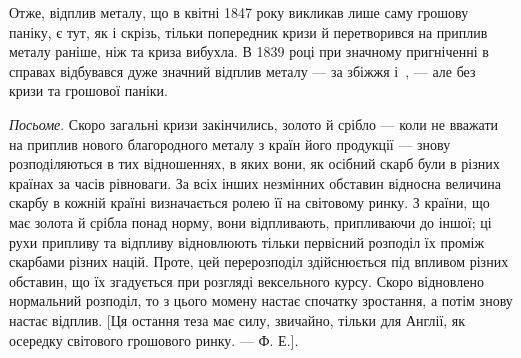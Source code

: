 Отже, відплив металу, що в квітні 1847 року викликав лише саму грошову
паніку, є тут, як і скрізь, тільки попередник кризи й перетворився на
приплив металу раніше, ніж та криза вибухла. В 1839 році при значному пригніченні
в справах відбувався дуже значний відплив металу — за збіжжя і~, —
але без кризи та грошової паніки.

\emph{Посьоме}. Скоро загальні кризи закінчились, золото й срібло — коли не
вважати на приплив нового благородного металу з країн його продукції —
знову розподіляються в тих відношеннях, в яких вони, як осібний скарб
були в різних країнах за часів рівноваги. За всіх інших незмінних обставин
відносна величина скарбу в кожній країні визначається ролею її на світовому
ринку. З країни, що має золота й срібла понад норму, вони відпливають, припливаючи
до іншої; ці рухи припливу та відпливу відновлюють тільки первісний
розподіл їх проміж скарбами різних націй. Проте, цей перерозподіл здійснюється
під впливом різних обставин, що їх згадується при розгляді вексельного курсу.
Скоро відновлено нормальний розподіл, то з цього момену настає спочатку зростання,
а потім знову настає відплив. [Ця остання теза має силу, звичайно,
тільки для Англії, як осередку світового грошового ринку. — Ф. Е.].
